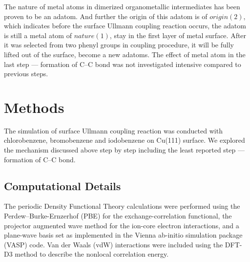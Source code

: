 \documentclass[%
 reprint,
 amsmath,amssymb,
 aps,
prb,
]{revtex4-1}
\begin{document}
The nature of metal atoms in dimerized organometallic intermediates has been proven to be an adatom. And further the origin of this adatom is of $origin(2)$, which indicates before the surface Ullmann coupling reaction occurs, the adatom is still a metal atom of $nature(1)$, stay in the first layer of metal surface. After it was selected from two phenyl groups in coupling procedure, it will be fully lifted out of the surface, become a new adatoms. The effect of metal atom in the last step --- formation of C--C bond was not investigated intensive compared to previous steps.


\section{Methods}

The simulation of surface Ullmann coupling reaction was conducted with chlorobenzene, bromobenzene and iodobenzene on Cu(111) surface. We explored the mechanism discussed above step by step including the least reported step --- formation of C--C bond.

\subsection{Computational Details}

The periodic Density Functional Theory calculations were performed using the Perdew–Burke-Ernzerhof (PBE) for the exchange-correlation functional, the projector augmented wave method for the ion-core electron interactions, and a plane-wave basis set as implemented in the Vienna ab-initio simulation package (VASP) code. Van der Waals (vdW) interactions were included using the DFT-D3 method to describe the nonlocal correlation energy. 
\end{document}
